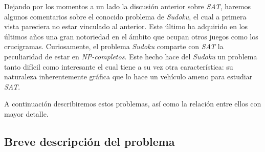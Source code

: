 \documentclass[12pt,lettersize,oneside]{article}
\begin{document}
Dejando por los momentos a un lado la discusión anterior sobre \emph{SAT},
haremos algunos comentarios sobre el conocido problema de \emph{Sudoku}, el cual
a primera vista pareciera no estar vinculado al anterior. Este último ha
adquirido en los últimos años una gran notoriedad en el ámbito que ocupan otros
juegos como los crucigramas. Curiosamente, el problema \emph{Sudoku} comparte
con \emph{SAT} la peculiaridad de estar en \emph{NP-completos}. Este hecho hace
del \emph{Sudoku} un problema tanto difícil como interesante el cual tiene a su
vez otra característica: su naturaleza inherentemente gráfica que lo hace un
vehículo ameno para estudiar \emph{SAT}.

A continuación describiremos estos problemas, así como la relación entre ellos
con mayor detalle.

\subsection{Breve descripción del problema} 
\end{document}
